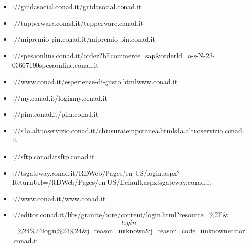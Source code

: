 \documentclass{article}
\begin{document}
\begin{itemize}
        
        
        \item \hrefhttps://guidasocial.conad.it/guidasocial.conad.it
    
        
        
        \item \hrefhttps://tupperware.conad.it/tupperware.conad.it
    
        
        
        \item \hrefhttp://mipremio-pin.conad.it/mipremio-pin.conad.it
    
        
        
        \item \hrefhttps://spesaonline.conad.it/order?bEcommerce=sap\&orderId=o-s-N-23-03667190spesaonline.conad.it
    
        
        
        \item \hrefhttps://www.conad.it/esperienze-di-gusto.htmlwww.conad.it
    
        
        
        \item \hrefhttps://my.conad.it/loginmy.conad.it
    
        
        
        \item \hrefhttps://pim.conad.it/pim.conad.it
    
        
        
        \item \hrefhttps://s1a.altuoservizio.conad.it/chiusuratemporanea.htmls1a.altuoservizio.conad.it
    
        
        
        \item \hrefhttp://sftp.conad.itsftp.conad.it
    
        
        
        \item \hrefhttps://tsgateway.conad.it/RDWeb/Pages/en-US/login.aspx?ReturnUrl=/RDWeb/Pages/en-US/Default.aspxtsgateway.conad.it
    
        
        
        \item \hrefhttps://www.conad.it/www.conad.it
    
        
        
        \item \hrefhttps://editor.conad.it/libs/granite/core/content/login.html?resource=\%2F\&$$login$$=\%24\%24login\%24\%24\&j\_reason=unknown\&j\_reason\_code=unknowneditor.conad.it
    

\end{itemize}
\end{document}
